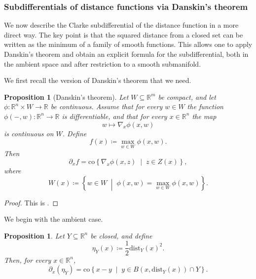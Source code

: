 \documentclass{amsart}
\newcommand{\R}{\mathbb{R}}
\newcommand{\dd}{\mathrm{dist}}
\newtheorem{proposition}[subsubsection]{Proposition}
\theoremstyle{definition}
\theoremstyle{remark}
\begin{document}
\subsubsection{Subdifferentials of distance functions via Danskin's theorem}

We now describe the Clarke subdifferential of the distance function in a more direct way. The key point is that the squared distance from a closed set can be written as the minimum of a family of smooth functions. This allows one to apply Danskin's theorem and obtain an explicit formula for the subdifferential, both in the ambient space and after restriction to a smooth submanifold.

We first recall the version of Danskin's theorem that we need.

\begin{proposition}[Danskin's theorem]\label{P:danskin}
Let $W \subseteq \R^m$ be compact, and let $\phi \colon \R^n \times W \to \R$ be continuous. Assume that for every $w \in W$ the function $\phi(-,w)\colon \R^n \to \R$ is differentiable, and that for every $x \in \R^n$ the map
\[
w \mapsto \nabla_x \phi(x,w)
\]
is continuous on $W$. Define
\[
f(x) \coloneqq \max_{w \in W} \phi(x,w).
\]
Then
\[
\partial_x f = \mathrm{co}\left\{ \nabla_x \phi(x,z) \;\middle|\; z \in Z(x)\right\},
\]
where
\[
W(x) \coloneqq \left\{ w \in W \;\middle|\; \phi(x,w)=\max_{w \in W}\phi(x,w)\right\}.
\]
\end{proposition}

\begin{proof}
This is \cite[Prop.~B.22(b)]{bertsekas1999nonlinear}.
\end{proof}

We begin with the ambient case.

\begin{proposition}\label{P:squared-distance-subgradient}
Let $Y \subseteq \R^n$ be closed, and define
\[
\eta_Y(x)\coloneqq \frac{1}{2}\dd_Y(x)^2.
\]
Then, for every $x \in \R^n$,
\[
\partial_x(\eta_Y)= \mathrm{co}\left\{ x-y \;\middle|\; y \in B(x,\dd_Y(x)) \cap Y \right\}.
\]
\end{proposition}
\end{document}
